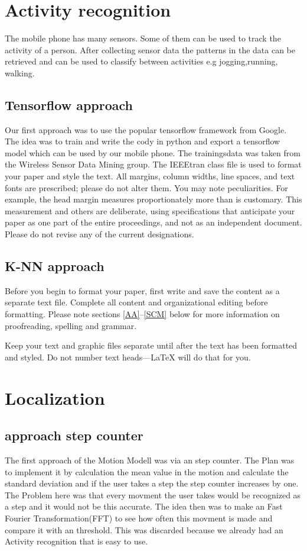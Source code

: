 \documentclass[conference]{IEEEtran}
\begin{document}
\section{Activity recognition}
The mobile phone has many sensors. Some of them can be used to track the activity of a person.  After collecting sensor data the patterns in the data can be retrieved and can be used to classify between activities e.g jogging,running, walking.
\subsection{Tensorflow approach}
Our first approach was to use the popular tensorflow framework from Google. The idea was to train and write the cody in python and export a tensorflow model which can be used by our mobile phone. The trainingsdata was taken from the Wireless Sensor Data Mining group.\cite{1}
The IEEEtran class file is used to format your paper and style the text. All margins, 
column widths, line spaces, and text fonts are prescribed; please do not 
alter them. You may note peculiarities. For example, the head margin
measures proportionately more than is customary. This measurement 
and others are deliberate, using specifications that anticipate your paper 
as one part of the entire proceedings, and not as an independent document. 
Please do not revise any of the current designations.

\subsection{K-NN approach}
Before you begin to format your paper, first write and save the content as a 
separate text file. Complete all content and organizational editing before 
formatting. Please note sections \ref{AA}--\ref{SCM} below for more information on 
proofreading, spelling and grammar.

Keep your text and graphic files separate until after the text has been 
formatted and styled. Do not number text heads---{\LaTeX} will do that 
for you.


\section*{Localization}

\subsection*{approach step counter}
The first approach of the Motion Modell was via an step counter. The Plan was to implement it by calculation the mean value in the motion and calculate the standard deviation and if the user takes a step the step counter increases by one. The Problem here was that every movment the user takes would be recognized as a step and it would not be this accurate. The idea then was to make an Fast Fourier Transformation(FFT) to see how often this movment is made and compare it with an threshold. This was discarded because we already had an Activity recognition that is easy to use.
\end{document}
